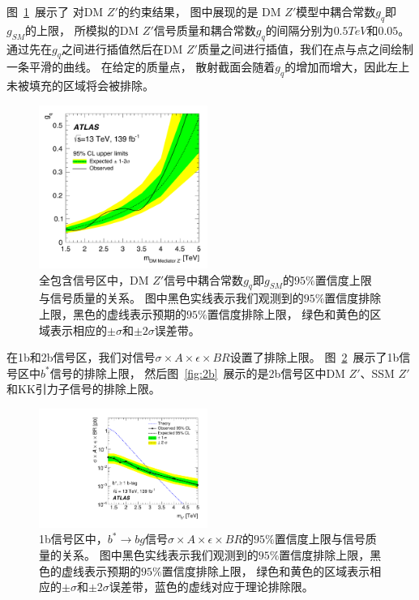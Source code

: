 图~\ref{fig:zprime}~展示了
对DM $Z'$的约束结果，
图中展现的是
DM $Z'$模型中耦合常数$g_q$即$g_{SM}$的上限，
所模拟的DM $Z'$信号质量和耦合常数$g_q$的间隔分别为$0.5TeV$和$0.05$。
通过先在$g_q$之间进行插值然后在DM $Z'$质量之间进行插值，我们在点与点之间绘制一条平滑的曲线。
在给定的质量点，
散射截面会随着$g_q$的增加而增大，因此左上未被填充的区域将会被排除。

\begin{figure}[tbp]
\centering
\includegraphics[width=0.49\textwidth]{figs/fig_05.pdf}
\caption{
 全包含信号区中，DM $Z'$信号中耦合常数$g_q$即$g_{SM}$的$95\%$置信度上限与信号质量的关系。
 图中黑色实线表示我们观测到的$95\%$置信度排除上限，黑色的虚线表示预期的$95\%$置信度排除上限，
 绿色和黄色的区域表示相应的$\pm \sigma$和$\pm 2\sigma$误差带。%
}
\label{fig:zprime}
\end{figure}


在1b和2b信号区，我们对信号$\sigma\times A \times \epsilon \times BR$设置了排除上限。
图~\ref{fig:1b}~展示了1b信号区中$b^*$信号的排除上限，
然后图~\ref{fig:2b}~展示的是2b信号区中DM $Z'$、SSM $Z\prime$和KK引力子信号的排除上限。


\begin{figure}[tbp]
\centering
\includegraphics[width=0.49\textwidth]{figs/fig_06.pdf}
\caption{
  1b信号区中，$b^* \to bg$信号$\sigma\times A \times \epsilon \times BR$的$95\%$置信度上限与信号质量的关系。
  图中黑色实线表示我们观测到的$95\%$置信度排除上限，黑色的虚线表示预期的$95\%$置信度排除上限，
  绿色和黄色的区域表示相应的$\pm \sigma$和$\pm 2\sigma$误差带，蓝色的虚线对应于理论排除限。
}
\label{fig:1b}
\end{figure}

